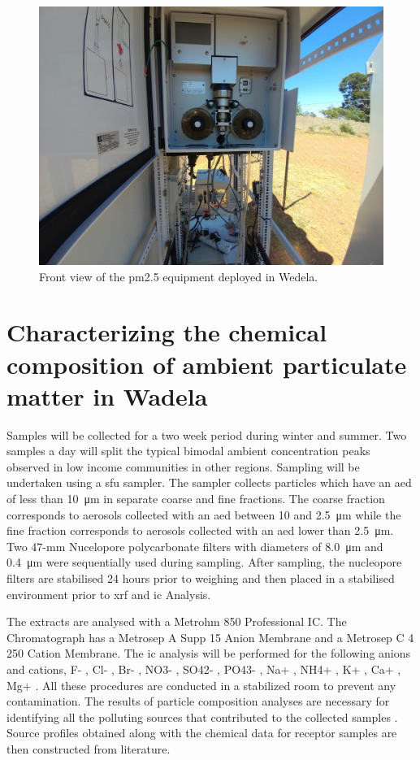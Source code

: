 \documentclass{nwureport}
\begin{document}
\begin{figure}[!htb]
    \centering
    \includegraphics[width=\textwidth]{images/wedela_6.jpeg}
    \caption[Front view of $PM_{2.5}$ equipment deployed in Wedela.]{Front view of the \gls{pm2.5} equipment deployed in Wedela.}
    \label{fig:wadela_instruments_pm2}
\end{figure}
\section{Characterizing the chemical composition of ambient particulate matter in Wadela}

Samples will be collected for a two week period during winter and summer. Two samples a day will split the
typical bimodal ambient concentration peaks observed in low income communities in other regions. Sampling
will be undertaken using a \gls{sfu} sampler. The sampler collects particles which have an
\gls{aed} of less than \SI{10}{\micro\meter} in separate coarse and fine fractions. The
coarse fraction corresponds to aerosols collected with an \gls{aed} between \num{10} and \SI{2.5}{\micro\meter} while the fine fraction
corresponds to aerosols collected with an \gls{aed} lower than \SI{2.5}{\micro\meter}. Two 47-mm Nucelopore polycarbonate
filters with diameters of \SI{8.0}{\micro\meter} and \SI{0.4}{\micro\meter} were sequentially used during sampling.
After sampling, the nucleopore filters are stabilised 24 hours prior to weighing and then placed in a stabilised
environment prior to \gls{xrf} and \gls{ic} Analysis.

The extracts are analysed with a Metrohm 850 Professional IC. The Chromatograph has a Metrosep A Supp 15 Anion Membrane and a Metrosep C 4 250 Cation Membrane. The \gls{ic} analysis will be performed for the following anions and cations, F- , Cl- , Br- , NO3- , SO42- , PO43- , Na+ , NH4+ , K+ , Ca+ , Mg+ . All these procedures are conducted in a stabilized room to prevent any contamination. The results of particle composition analyses are necessary for identifying all the polluting sources that contributed to the collected samples \citep{Begum2017}. Source profiles obtained along with the chemical data for receptor samples are then constructed from literature.
\end{document}
